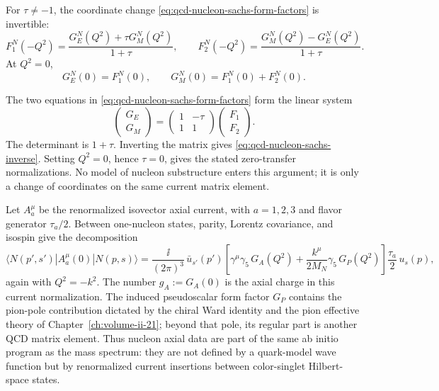 \begin{remark}
\label{rem:qcd-nucleon-sachs-coordinate-transform}
For \(\tau\ne -1\), the coordinate change
\eqref{eq:qcd-nucleon-sachs-form-factors} is invertible:
\begin{equation}
  F_1^N(-Q^2)
  =
  \frac{G_E^N(Q^2)+\tau G_M^N(Q^2)}{1+\tau},
  \qquad
  F_2^N(-Q^2)
  =
  \frac{G_M^N(Q^2)-G_E^N(Q^2)}{1+\tau}.
  \label{eq:qcd-nucleon-sachs-inverse}
\end{equation}
At \(Q^2=0\),
\[
  G_E^N(0)=F_1^N(0),\qquad
  G_M^N(0)=F_1^N(0)+F_2^N(0).
\]
\par
The two equations in \eqref{eq:qcd-nucleon-sachs-form-factors} form the
linear system
\[
  \begin{pmatrix}G_E\\G_M\end{pmatrix}
  =
  \begin{pmatrix}1&-\tau\\ 1&1\end{pmatrix}
  \begin{pmatrix}F_1\\F_2\end{pmatrix}.
\]
The determinant is \(1+\tau\).  Inverting the matrix gives
\eqref{eq:qcd-nucleon-sachs-inverse}.  Setting \(Q^2=0\), hence \(\tau=0\),
gives the stated zero-transfer normalizations.  No model of nucleon
substructure enters this argument; it is only a change of coordinates on the
same current matrix element.
\end{remark}

\begin{definition}
\label{def:qcd-nucleon-axial-form-factors}
Let \(A_a^\mu\) be the renormalized isovector axial current, with
\(a=1,2,3\) and flavor generator \(\tau_a/2\).  Between one-nucleon states,
parity, Lorentz covariance, and isospin give the decomposition
\begin{equation}
  \langle N(p',s')|A_a^\mu(0)|N(p,s)\rangle
  =
  \frac{\ii}{(2\pi)^3}\,
  \bar u_{s'}(p')
  \left[
    \gamma^\mu\gamma_5\,G_A(Q^2)
    +
    \frac{k^\mu}{2M_N}\gamma_5\,G_P(Q^2)
  \right]
  \frac{\tau_a}{2}\,
  u_s(p),
  \label{eq:qcd-nucleon-axial-form-factors}
\end{equation}
again with \(Q^2=-k^2\).  The number \(g_A:=G_A(0)\) is the axial charge in
this current normalization.  The induced pseudoscalar form factor \(G_P\)
contains the pion-pole contribution dictated by the chiral Ward identity and
the pion effective theory of Chapter~\ref{ch:volume-ii-21}; beyond that pole,
its regular part is another QCD matrix element.  Thus nucleon axial data are
part of the same ab initio program as the mass spectrum: they are not
defined by a quark-model wave function but by renormalized current insertions
between color-singlet Hilbert-space states.
\end{definition}

